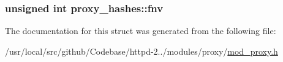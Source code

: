 \subsubsection[{\texorpdfstring{fnv}{fnv}}]{\setlength{\rightskip}{0pt plus 5cm}unsigned {\bf int} proxy\+\_\+hashes\+::fnv}\hypertarget{structproxy__hashes_a229642e1523de07c9edb64b67174dd90}{}\label{structproxy__hashes_a229642e1523de07c9edb64b67174dd90}


The documentation for this struct was generated from the following file\+:\begin{DoxyCompactItemize}
\item 
/usr/local/src/github/\+Codebase/httpd-\/2../modules/proxy/\hyperlink{mod__proxy_8h}{mod\+\_\+proxy.\+h}\end{DoxyCompactItemize}
